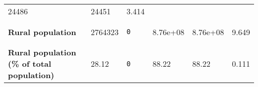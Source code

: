 \documentclass[
]{article}
\begin{document}
\begin{longtable}[]{@{}llllll@{}}
\begin{minipage}[t]{0.13\columnwidth}
24486\strut
\end{minipage} & \begin{minipage}[t]{0.13\columnwidth}\raggedright
24451\strut
\end{minipage} & \begin{minipage}[t]{0.13\columnwidth}\raggedright
3.414\strut
\end{minipage}\tabularnewline
\begin{minipage}[t]{0.20\columnwidth}\raggedright
\textbf{Rural population}\strut
\end{minipage} & \begin{minipage}[t]{0.12\columnwidth}\raggedright
2764323\strut
\end{minipage} & \begin{minipage}[t]{0.14\columnwidth}\raggedright
\begin{verbatim}
0
\end{verbatim}
\strut
\end{minipage} & \begin{minipage}[t]{0.13\columnwidth}\raggedright
8.76e+08\strut
\end{minipage} & \begin{minipage}[t]{0.13\columnwidth}\raggedright
8.76e+08\strut
\end{minipage} & \begin{minipage}[t]{0.13\columnwidth}\raggedright
9.649\strut
\end{minipage}\tabularnewline
\begin{minipage}[t]{0.20\columnwidth}\raggedright
\textbf{Rural population (\% of total population)}\strut
\end{minipage} & \begin{minipage}[t]{0.12\columnwidth}\raggedright
28.12\strut
\end{minipage} & \begin{minipage}[t]{0.14\columnwidth}\raggedright
\begin{verbatim}
0
\end{verbatim}
\strut
\end{minipage} & \begin{minipage}[t]{0.13\columnwidth}\raggedright
88.22\strut
\end{minipage} & \begin{minipage}[t]{0.13\columnwidth}\raggedright
88.22\strut
\end{minipage} & \begin{minipage}[t]{0.13\columnwidth}\raggedright
0.111\strut
\end{minipage}\tabularnewline
\bottomrule
\end{longtable}
\end{document}
